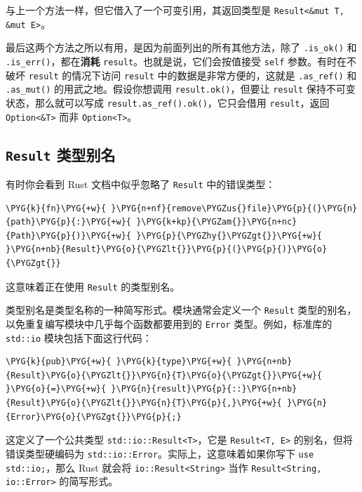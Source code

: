 与上一个方法一样，但它借入了一个可变引用，其返回类型是 \texttt{Result<\&mut T, \&mut E>}。

最后这两个方法之所以有用，是因为前面列出的所有其他方法，除了 \texttt{.is\_ok()} 和 \texttt{.is\_err()}，都在\textbf{消耗} \texttt{result}。也就是说，它们会按值接受 \texttt{self} 参数。有时在不破坏 \texttt{result} 的情况下访问 \texttt{result} 中的数据是非常方便的，这就是 \texttt{.as\_ref()} 和 \texttt{.as\_mut()} 的用武之地。假设你想调用 \texttt{result.ok()}，但要让 \texttt{result} 保持不可变状态，那么就可以写成 \texttt{result.as\_ref().ok()}，它只会借用 \texttt{result}，返回 \texttt{Option<\&T>} 而非 \texttt{Option<T>}。

\subsection{\texttt{Result} 类型别名}

有时你会看到 Rust 文档中似乎忽略了 \texttt{Result} 中的错误类型：

\begin{Verbatim}[commandchars=\\\{\},breaklines=true,breakanywhere=true,fontsize=\codefont,xleftmargin=17bp]
\PYG{k}{fn}\PYG{+w}{ }\PYG{n+nf}{remove\PYGZus{}file}\PYG{p}{(}\PYG{n}{path}\PYG{p}{:}\PYG{+w}{ }\PYG{k+kp}{\PYGZam{}}\PYG{n+nc}{Path}\PYG{p}{)}\PYG{+w}{ }\PYG{p}{\PYGZhy{}\PYGZgt{}}\PYG{+w}{ }\PYG{n+nb}{Result}\PYG{o}{\PYGZlt{}}\PYG{p}{(}\PYG{p}{)}\PYG{o}{\PYGZgt{}}
\end{Verbatim}

这意味着正在使用 \texttt{Result} 的类型别名。

类型别名是类型名称的一种简写形式。模块通常会定义一个 \texttt{Result} 类型的别名，以免重复编写模块中几乎每个函数都要用到的 \texttt{Error} 类型。例如，标准库的 \texttt{std::io} 模块包括下面这行代码：

\begin{Verbatim}[commandchars=\\\{\},breaklines=true,breakanywhere=true,fontsize=\codefont,xleftmargin=17bp]
\PYG{k}{pub}\PYG{+w}{ }\PYG{k}{type}\PYG{+w}{ }\PYG{n+nb}{Result}\PYG{o}{\PYGZlt{}}\PYG{n}{T}\PYG{o}{\PYGZgt{}}\PYG{+w}{ }\PYG{o}{=}\PYG{+w}{ }\PYG{n}{result}\PYG{p}{::}\PYG{n+nb}{Result}\PYG{o}{\PYGZlt{}}\PYG{n}{T}\PYG{p}{,}\PYG{+w}{ }\PYG{n}{Error}\PYG{o}{\PYGZgt{}}\PYG{p}{;}
\end{Verbatim}

这定义了一个公共类型 \texttt{std::io::Result<T>}，它是 \texttt{Result<T, E>} 的别名，但将错误类型硬编码为 \texttt{std::io::Error}。实际上，这意味着如果你写下 \texttt{use std::io;}，那么 Rust 就会将 \texttt{io::Result<String>} 当作 \texttt{Result<String, io::Error>} 的简写形式。

